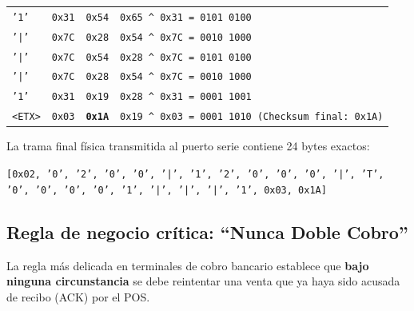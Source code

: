 \documentclass{../../plantilla/raysac-informe}
\begin{document}
\begin{longtable}{@{}p{1.5cm}p{1.8cm}p{2.5cm}p{8.0cm}@{}}
\texttt{'1'} & \texttt{0x31} & \texttt{0x54} & \texttt{0x65 \^{} 0x31 = 0101 0100} \\
\texttt{'|'} & \texttt{0x7C} & \texttt{0x28} & \texttt{0x54 \^{} 0x7C = 0010 1000} \\
\texttt{'|'} & \texttt{0x7C} & \texttt{0x54} & \texttt{0x28 \^{} 0x7C = 0101 0100} \\
\texttt{'|'} & \texttt{0x7C} & \texttt{0x28} & \texttt{0x54 \^{} 0x7C = 0010 1000} \\
\texttt{'1'} & \texttt{0x31} & \texttt{0x19} & \texttt{0x28 \^{} 0x31 = 0001 1001} \\
\texttt{<ETX>} & \texttt{0x03} & \textbf{\texttt{0x1A}} & \texttt{0x19 \^{} 0x03 = 0001 1010 (Checksum final: 0x1A)} \\
\end{longtable}

La trama final física transmitida al puerto serie contiene 24 bytes exactos:
\begin{center}
\texttt{[0x02, '0', '2', '0', '0', '|', '1', '2', '0', '0', '0', '|', 'T', '0', '0', '0', '0', '1', '|', '|', '|', '1', 0x03, 0x1A]}
\end{center}

\subsection{Regla de negocio crítica: ``Nunca Doble Cobro''}
La regla más delicada en terminales de cobro bancario establece que \textbf{bajo ninguna circunstancia}
se debe reintentar una venta que ya haya sido acusada de recibo (ACK) por el POS.
\end{document}
